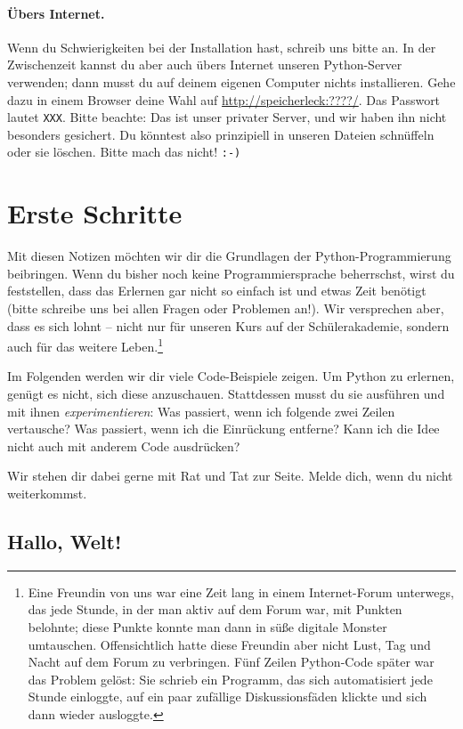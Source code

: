 \documentclass{blatt}
\begin{document}
\paragraph{Übers Internet.} Wenn du Schwierigkeiten bei der Installation hast,
schreib uns bitte an. In der Zwischenzeit kannst du aber auch übers Internet
unseren Python-Server verwenden; dann musst du auf deinem eigenen Computer
nichts installieren. Gehe dazu in einem Browser deine Wahl auf
\url{http://speicherleck:????/}. Das Passwort lautet \texttt{XXX}. Bitte
beachte: Das ist unser privater Server, und wir haben ihn nicht besonders
gesichert. Du könntest also prinzipiell in unseren Dateien schnüffeln oder sie
löschen. Bitte mach das nicht! \texttt{:-)}


\section{Erste Schritte}

Mit diesen Notizen möchten wir dir die Grundlagen der Python-Programmierung
beibringen. Wenn du bisher noch keine Programmiersprache beherrschst, wirst du
feststellen, dass das Erlernen gar nicht so einfach ist und etwas
Zeit benötigt (bitte schreibe uns bei allen Fragen oder Problemen an!). Wir
versprechen aber, dass es sich lohnt -- nicht nur für unseren Kurs auf der
Schülerakademie, sondern auch für das weitere Leben.\footnote{Eine Freundin von
uns war eine Zeit lang in einem Internet-Forum unterwegs, das jede Stunde, in
der man aktiv auf dem Forum war, mit Punkten belohnte; diese Punkte konnte man
dann in süße digitale Monster umtauschen. Offensichtlich hatte diese Freundin
aber nicht Lust, Tag und Nacht auf dem Forum zu verbringen. Fünf Zeilen
Python-Code später war das Problem gelöst: Sie schrieb ein Programm,
das sich automatisiert jede Stunde einloggte, auf ein paar zufällige
Diskussionsfäden klickte und sich dann wieder ausloggte.}

Im Folgenden werden wir dir viele Code-Beispiele zeigen. Um Python zu erlernen,
genügt es nicht, sich diese anzuschauen. Stattdessen musst du sie ausführen und
mit ihnen \emph{experimentieren}: Was passiert, wenn ich folgende zwei Zeilen
vertausche? Was passiert, wenn ich die Einrückung entferne? Kann ich die Idee
nicht auch mit anderem Code ausdrücken?

Wir stehen dir dabei gerne mit Rat und Tat zur Seite. Melde dich, wenn du nicht
weiterkommst.


\subsection{Hallo, Welt!}
\end{document}
